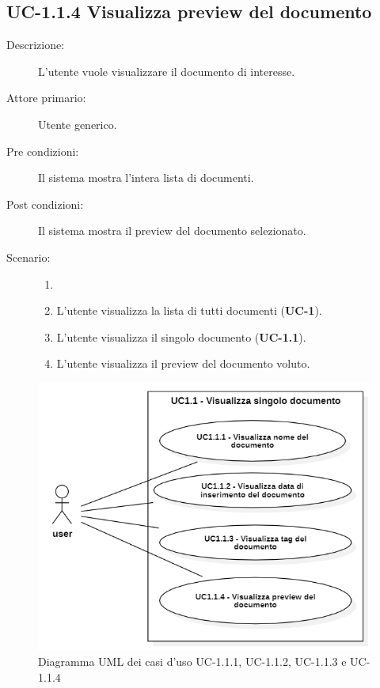 \subsection{UC-1.1.4 Visualizza preview del documento}
\begin{description}
    \item[Descrizione:] L'utente vuole visualizzare il documento di interesse.
    \item[Attore primario:] Utente generico.
    \item[Pre condizioni:] Il sistema mostra l’intera lista di documenti.
    \item[Post condizioni:] Il sistema mostra il preview del documento selezionato.
    \item[Scenario:]
    \begin{enumerate}
        \item[]
        \item L’utente visualizza la lista di tutti documenti (\textbf{UC-1}).
        \item L'utente visualizza il singolo documento (\textbf{UC-1.1}).
        \item L'utente visualizza il preview del documento voluto.
    \end{enumerate}
\end{description}

\begin{figure}[H]
    \centering
    \includegraphics[width=0.8\linewidth]{UC1.1.1-2-3-4.png} %
    \caption{Diagramma UML dei casi d'uso UC-1.1.1, UC-1.1.2, UC-1.1.3 e UC-1.1.4} 
    \label{fig:UC3.1.1-2-3-4}
\end{figure}

